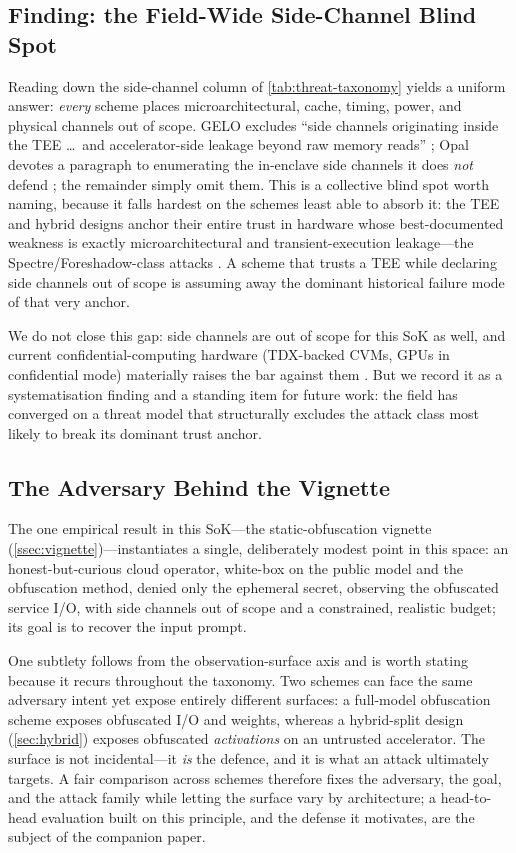 \subsection{Finding: the Field-Wide Side-Channel Blind Spot}
\label{ssec:sidechannel}

Reading down the side-channel column of \cref{tab:threat-taxonomy} yields a
uniform answer: \emph{every} scheme places microarchitectural, cache, timing,
power, and physical channels out of scope. GELO excludes ``side channels
originating inside the TEE \dots\ and accelerator-side leakage beyond raw memory
reads'' \citep{belikov_gelo}; Opal devotes a paragraph to enumerating the
in-enclave side channels it does \emph{not} defend \citep{kaviani_opal}; the
remainder simply omit them. This is a collective blind spot worth naming,
because it falls hardest on the schemes least able to absorb it: the TEE and
hybrid designs anchor their entire trust in hardware whose best-documented
weakness is exactly microarchitectural and transient-execution leakage---the
Spectre/Foreshadow-class attacks . A scheme that trusts a TEE while declaring
side channels out of scope is assuming away the dominant historical failure
mode of that very anchor.

We do not close this gap: side channels are out of scope for this SoK as
well, and current confidential-computing hardware
(TDX-backed CVMs, GPUs in confidential mode) materially raises the bar against
them \citep{kaviani_opal}. But we record it as a systematisation finding and a
standing item for future work: the field has converged on a threat model that
structurally excludes the attack class most likely to break its dominant trust
anchor.

\subsection{The Adversary Behind the Vignette}
\label{sec:threat-ours}

The one empirical result in this SoK---the static-obfuscation vignette
(\cref{ssec:vignette})---instantiates a single, deliberately modest point in
this space: an honest-but-curious cloud operator, white-box on the public model
and the obfuscation method, denied only the ephemeral secret, observing the
obfuscated service I/O, with side channels out of scope and a constrained,
realistic budget; its goal is to recover the input prompt.

One subtlety follows from the observation-surface axis and is worth stating
because it recurs throughout the taxonomy. Two schemes can face the same
adversary intent yet expose entirely different surfaces: a full-model
obfuscation scheme exposes obfuscated I/O and weights, whereas a hybrid-split
design (\cref{sec:hybrid}) exposes obfuscated \emph{activations} on an untrusted
accelerator. The surface is not incidental---it \emph{is} the defence, and it is
what an attack ultimately targets. A fair comparison across schemes therefore
fixes the adversary, the goal, and the attack family while letting the surface
vary by architecture; a head-to-head evaluation built on this principle, and the
defense it motivates, are the subject of the companion paper.

